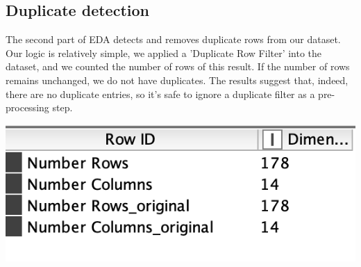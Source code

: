 \documentclass[11pt]{article}
\begin{document}
		\subsection*{Duplicate detection}
			The second part of EDA detects and removes duplicate rows from our dataset. Our logic is relatively simple, we applied a 'Duplicate Row Filter' into the dataset, and we counted the number of rows of this result. If the number of rows remains unchanged, we do not have duplicates. The results suggest that, indeed, there are no duplicate entries, so it's safe to ignore a duplicate filter as a pre-processing step.
			\iftrue
			\begin{center}
				\includegraphics[scale=0.5]{res/t0/t02/t02-results}
			\end{center}
			\fi
\end{document}
